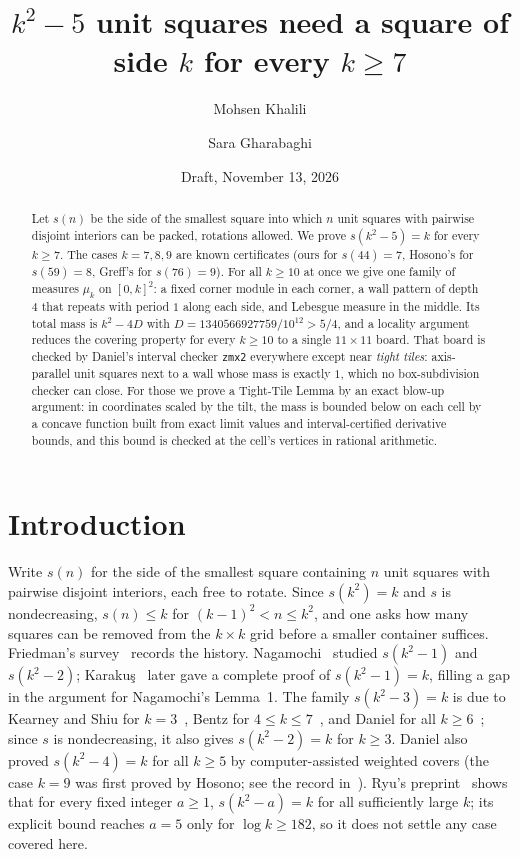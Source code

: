 \documentclass[11pt]{amsart}
\title{$k^2-5$ unit squares need a square of side $k$ for every $k\ge7$}
\author{Mohsen Khalili}
\author{Sara Gharabaghi}
\date{Draft, November 13, 2026}
\theoremstyle{definition}
\theoremstyle{remark}
\begin{document}
\begin{abstract}
Let $s(n)$ be the side of the smallest square into which $n$ unit squares with pairwise disjoint interiors can be
packed, rotations allowed. We prove $s(k^2-5)=k$ for every $k\ge7$. The cases $k=7,8,9$ are known
certificates (ours for $s(44)=7$, Hosono's for $s(59)=8$, Greff's for $s(76)=9$). For all $k\ge10$ at once we give
one family of measures $\mu_k$ on $[0,k]^2$: a fixed corner module in each corner, a wall pattern of depth $4$ that
repeats with period $1$ along each side, and Lebesgue measure in the middle. Its total mass is $k^2-4D$ with
$D=1340566927759/10^{12}>5/4$, and a locality argument reduces the covering property for every $k\ge10$ to a single
$11\times11$ board. That board is checked by Daniel's interval checker \texttt{zmx2} everywhere except near
\emph{tight tiles}: axis-parallel unit squares next to a wall whose mass is exactly $1$, which no box-subdivision
checker can close. For those we prove a Tight-Tile Lemma by an exact blow-up argument: in coordinates scaled by the
tilt, the mass is bounded below on each cell by a concave function built from exact limit values and
interval-certified derivative bounds, and this bound is checked at the cell's vertices in rational arithmetic.
\end{abstract}
\maketitle

\section{Introduction}

Write $s(n)$ for the side of the smallest square containing $n$ unit squares with pairwise disjoint interiors,
each free to rotate. Since $s(k^2)=k$ and $s$ is nondecreasing, $s(n)\le k$ for $(k-1)^2<n\le k^2$, and one asks how
many squares can be removed from the $k\times k$ grid before a smaller container suffices. Friedman's
survey~\cite{friedman} records the history. Nagamochi~\cite{nagamochi} studied $s(k^2-1)$ and $s(k^2-2)$;
Karaku\c{s}~\cite{karakus} later gave a complete proof of $s(k^2-1)=k$, filling a gap in the argument for
Nagamochi's Lemma~1. The family $s(k^2-3)=k$ is due to Kearney and Shiu for $k=3$~\cite{kearney}, Bentz for
$4\le k\le7$~\cite{bentz,bentz2}, and Daniel for all $k\ge6$~\cite{daniel}; since $s$ is nondecreasing, it also gives
$s(k^2-2)=k$ for $k\ge3$. Daniel also proved $s(k^2-4)=k$ for all $k\ge5$ by computer-assisted weighted covers (the
case $k=9$ was first proved by Hosono; see the record in~\cite{daniel}). Ryu's preprint~\cite{ryu} shows that for
every fixed integer $a\ge1$, $s(k^2-a)=k$ for all sufficiently large $k$; its explicit bound reaches $a=5$ only for
$\log k\ge182$, so it does not settle any case covered here.
\end{document}
